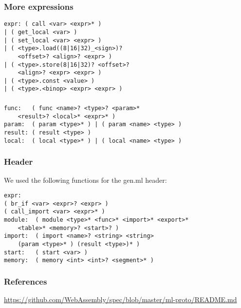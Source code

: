 \documentclass{beamer}
\begin{document}

\begin{frame}[fragile]
\frametitle{More expressions}

\begin{verbatim}
expr: ( call <var> <expr>* )
| ( get_local <var> )
| ( set_local <var> <expr> )
| ( <type>.load((8|16|32)_<sign>)?
	<offset>? <align>? <expr> )
| ( <type>.store(8|16|32)? <offset>?
	<align>? <expr> <expr> )
| ( <type>.const <value> )
| ( <type>.<binop> <expr> <expr> )

\end{verbatim}

\end{frame}



\begin{frame}[fragile]
\frametitle{}

\begin{verbatim}
func:   ( func <name>? <type>? <param>*
	<result>? <local>* <expr>* )
param:  ( param <type>* ) | ( param <name> <type> )
result: ( result <type> )
local:  ( local <type>* ) | ( local <name> <type> )

\end{verbatim}

\end{frame}



\begin{frame}[fragile]
\frametitle{Header}

We used the following functions for the gen.ml header:
\begin{verbatim}
expr:
( br_if <var> <expr>? <expr> )
( call_import <var> <expr>* )
module:  ( module <type>* <func>* <import>* <export>*
	<table>* <memory>? <start>? )
import:  ( import <name>? <string> <string>
	(param <type>* ) (result <type>)* )
start:   ( start <var> )
memory:  ( memory <int> <int>? <segment>* )

\end{verbatim}

\end{frame}

\begin{frame}
\frametitle{References}
\url{https://github.com/WebAssembly/spec/blob/master/ml-proto/README.md}
\end{frame}
\end{document}
